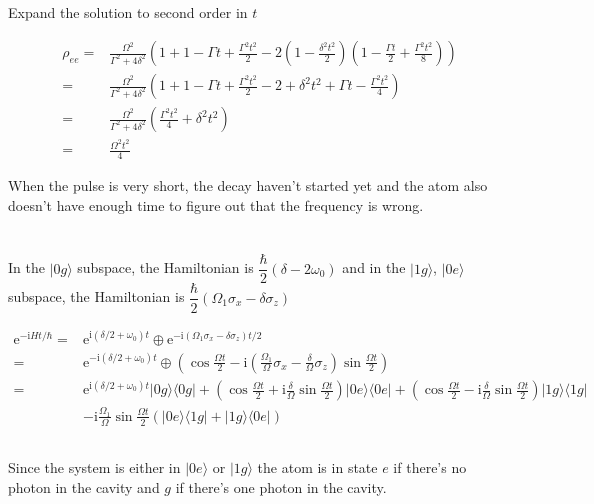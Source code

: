 \documentclass[10pt,fleqn]{article}
\newcommand{\ue}{\mathrm{e}}
\newcommand{\ui}{\mathrm{i}}
\newcommand{\eqar}[1]
{
  \begin{align*}
    #1
  \end{align*}
}
\newcommand{\paren}[1]{{\left({#1}\right)}}
\begin{document}
\subsection{}
Expand the solution to second order in $t$
\eqar{
  \rho_{ee}=&\frac{\Omega^2}{\Gamma^2+4\delta^2}\paren{1+1-\Gamma t+\frac{\Gamma^2t^2}{2}-2\paren{1-\frac{\delta^2t^2}{2}}\paren{1-\frac{\Gamma t}{2}+\frac{\Gamma^2t^2}{8}}}\\
  =&\frac{\Omega^2}{\Gamma^2+4\delta^2}\paren{1+1-\Gamma t+\frac{\Gamma^2t^2}{2}-2+\delta^2t^2+\Gamma t-\frac{\Gamma^2t^2}{4}}\\
  =&\frac{\Omega^2}{\Gamma^2+4\delta^2}\paren{\frac{\Gamma^2t^2}{4}+\delta^2t^2}\\
  =&\frac{\Omega^2t^2}{4}
}
When the pulse is very short, the decay haven't started yet and the atom also doesn't have enough time to figure out that the frequency is wrong.

\section{}
\subsection{}
In the $|0g\rangle$ subspace, the Hamiltonian is $\dfrac{\hbar}{2}\paren{\delta-2\omega_0}$ and in the $|1g\rangle$, $|0e\rangle$ subspace, the Hamiltonian is $\dfrac{\hbar}{2}\paren{\Omega_1\sigma_x-\delta\sigma_z}$
\eqar{
  \ue^{-\ui Ht/\hbar}=&\ue^{\ui\paren{\delta/2+\omega_0}t}\oplus\ue^{-\ui\paren{\Omega_1\sigma_x-\delta\sigma_z}t/2}\\
  =&\ue^{-\ui\paren{\delta/2+\omega_0}t}\oplus
  \paren{\cos\frac{\Omega t}{2}-\ui\paren{\frac{\Omega_1}{\Omega}\sigma_x-\frac{\delta}{\Omega}\sigma_z}\sin\frac{\Omega t}{2}}\\
  =&\ue^{\ui\paren{\delta/2+\omega_0}t}|0g\rangle\langle0g|+\paren{\cos\frac{\Omega t}{2}+\ui\frac{\delta}{\Omega}\sin\frac{\Omega t}{2}}|0e\rangle\langle0e|+\paren{\cos\frac{\Omega t}{2}-\ui\frac{\delta}{\Omega}\sin\frac{\Omega t}{2}}|1g\rangle\langle1g|\\
  &-\ui\frac{\Omega_1}{\Omega}\sin\frac{\Omega t}{2}\paren{|0e\rangle\langle1g|+|1g\rangle\langle0e|}
}
\subsection{}
Since the system is either in $|0e\rangle$ or $|1g\rangle$ the atom is in state $e$ if there's no photon in the cavity and $g$ if there's one photon in the cavity.
\end{document}
